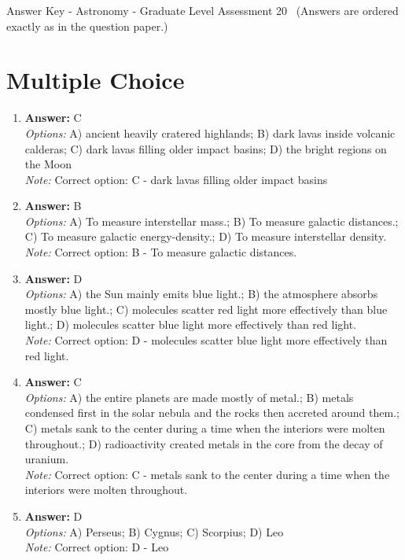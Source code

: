 \documentclass[12pt]{article}
\begin{document}
\begin{center}
Answer Key - Astronomy - Graduate Level Assessment 20 \
\small (Answers are ordered exactly as in the question paper.)
\end{center}

\section*{Multiple Choice}
\begin{enumerate}[label=\arabic*.]
\item \textbf{Answer:} C
\\ \textit{Options:} A) ancient heavily cratered highlands; B) dark lavas inside volcanic calderas; C) dark lavas filling older impact basins; D) the bright regions on the Moon
\\ \textit{Note:} Correct option: C - dark lavas filling older impact basins
\item \textbf{Answer:} B
\\ \textit{Options:} A) To measure interstellar mass.; B) To measure galactic distances.; C) To measure galactic energy-density.; D) To measure interstellar density.
\\ \textit{Note:} Correct option: B - To measure galactic distances.
\item \textbf{Answer:} D
\\ \textit{Options:} A) the Sun mainly emits blue light.; B) the atmosphere absorbs mostly blue light.; C) molecules scatter red light more effectively than blue light.; D) molecules scatter blue light more effectively than red light.
\\ \textit{Note:} Correct option: D - molecules scatter blue light more effectively than red light.
\item \textbf{Answer:} C
\\ \textit{Options:} A) the entire planets are made mostly of metal.; B) metals condensed first in the solar nebula and the rocks then accreted around them.; C) metals sank to the center during a time when the interiors were molten throughout.; D) radioactivity created metals in the core from the decay of uranium.
\\ \textit{Note:} Correct option: C - metals sank to the center during a time when the interiors were molten throughout.
\item \textbf{Answer:} D
\\ \textit{Options:} A) Perseus; B) Cygnus; C) Scorpius; D) Leo
\\ \textit{Note:} Correct option: D - Leo
\end{enumerate}
\end{document}
